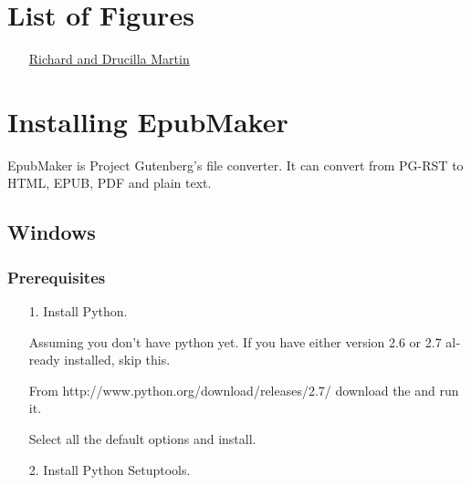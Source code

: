 \documentclass[a5paper]{book}
\begin{document}
\begin{german}
\cleardoublepage
\label{id3}%
\hypertarget{id3}{}%
%
\chapter*{
List of Figures}


\begin{itemize}
\item[] \hyperlink{figure-4}{Richard and Drucilla Martin}
\end{itemize}

%
\mainmatter
%


\cleardoublepage
\label{installing-epubmaker}%
\hypertarget{installing-epubmaker}{}%
%
\chapter*{
Installing EpubMaker}


EpubMaker is Project Gutenberg’s file converter. It can convert from
PG-RST to HTML, EPUB, PDF and plain text.\par

%
\label{windows}%
\hypertarget{windows}{}%
%
\section*{Windows}


%
\label{prerequisites}%
\hypertarget{prerequisites}{}%
%
\subsection*{Prerequisites}


\begin{itemize}
\item[1.] 
Install Python.\par

Assuming you don’t have python yet. If you have either version 2.6
or 2.7 already installed, skip this.\par

From {http://www.python.org/download/releases/2.7/} download
the {} and run it.\par

Select all the default options and install.\par

\item[2.] 
Install Python Setuptools.\par


\end{itemize}
\end{german}
\end{document}
